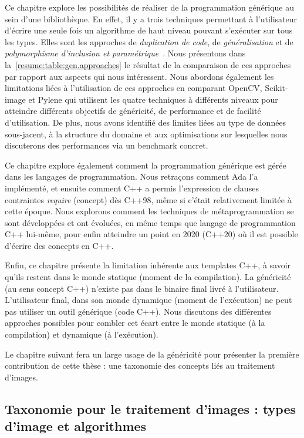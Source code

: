 Ce chapitre explore les possibilités de réaliser de la programmation générique au sein d'une bibliothèque. En effet, il
y a trois techniques permettant à l'utilisateur d'écrire une seule fois un algorithme de haut niveau pouvant s'exécuter
sur tous les types. Elles sont les approches de \emph{duplication de code}, de \emph{généralisation} et de
\emph{polymorphisme d'inclusion et paramétrique}~\parencite{gibbons.2007.datatype}. Nous présentons dans
la~\cref{resume:table:gen.approaches} le résultat de la comparaison de ces approches par rapport aux aspects qui nous
intéressent. Nous abordons également les limitations liées à l'utilisation de ces approches en comparant OpenCV,
Scikit-image et Pylene qui utilisent les quatre techniques à différents niveaux pour atteindre différents objectifs de
généricité, de performance et de facilité d'utilisation. De plus, nous avons identifié des limites liées au type de
données sous-jacent, à la structure du domaine et aux optimisations sur lesquelles nous discuterons des performances via
un benchmark concret.

Ce chapitre explore également comment la programmation générique est gérée dans les langages de programmation. Nous
retraçons comment Ada l'a implémenté, et ensuite comment C++ a permis l'expression de clauses contraintes \emph{require}
(concept) dès C++98, même si c'était relativement limitée à cette époque. Nous explorons comment les techniques de
métaprogrammation se sont développées et ont évoluées, en même temps que langage de programmation C++ lui-même, pour
enfin atteindre un point en 2020 (C++20) où il est possible d'écrire des concepts en C++.

Enfin, ce chapitre présente la limitation inhérente aux templates C++, à savoir qu'ils restent dans le monde statique
(moment de la compilation). La généricité (au sens concept C++) n'existe pas dans le binaire final livré à
l'utilisateur. L'utilisateur final, dans son monde dynamique (moment de l'exécution) ne peut pas utiliser un outil
générique (code C++). Nous discutons des différentes approches possibles pour combler cet écart entre le monde statique
(à la compilation) et dynamique (à l'exécution).

Le chapitre suivant fera un large usage de la généricité pour présenter la première contribution de cette thèse : une
taxonomie des concepts liés au traitement d'images.


\subsection*{Taxonomie pour le traitement d'images : types d'image et algorithmes}


